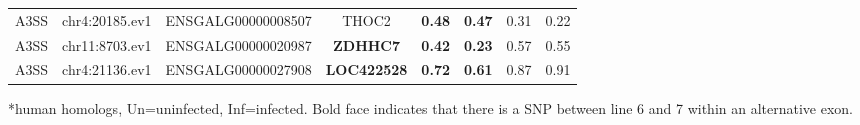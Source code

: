 \documentclass[10pt]{article}
\begin{document}
\begin{table}[!ht]
\begin{tabular}{cccccccc}
A3SS & chr4:20185.ev1 & ENSGALG00000008507 & THOC2 & \textbf{0.48} & \textbf{0.47} & 0.31 & 0.22 \\
A3SS & chr11:8703.ev1 & ENSGALG00000020987 & \textbf{ZDHHC7} & \textbf{0.42} & \textbf{0.23} & 0.57 & 0.55 \\
A3SS & chr4:21136.ev1 & ENSGALG00000027908 & \textbf{LOC422528} & \textbf{0.72} & \textbf{0.61} & 0.87 & 0.91 \\
\hline
\end{tabular}
\begin{flushleft}
    *human homologs, Un=uninfected, Inf=infected.
    Bold face indicates that there is a SNP between line 6 and 7 within an alternative exon.
\end{flushleft}
\label{tab:line67i_diff_line67u_two}
\end{table}
\end{document}

